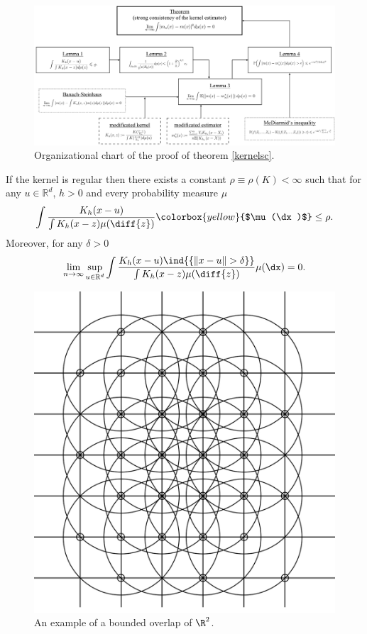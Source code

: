\begin{figure}[h] 
    \includegraphics[scale=0.155]{organigramkernel.jpeg}
    \centering
    \caption{Organizational chart of the proof of theorem \ref{kernelsc}.} \label{chartkernelproof}
\end{figure}

\begin{lemma} \label{coveringlemma}
If the kernel is regular then there exists a constant $\rho \equiv \rho(K)<\infty$ such that for any $u \in \mathbb{R}^d$, $h>0$ and every probability measure $\mu$ \[\int \frac{K_h(x-u)}{\int K_h(x-z) \mu(\diff{z})} \colorbox{yellow}{$\mu(\dx)$} \leq \rho.\]
Moreover, for any $\delta > 0$ \[\lim_{n\to\infty} \sup\limits_{u \in \mathbb{R}^d} \int \frac{K_h(x-u) \ind{\{ \| x-u \| > \delta \} }}{\int K_h(x-z) \mu(\diff{z})} \mu(\dx) = 0.\]
\end{lemma}

\begin{figure}[h] 
    \includegraphics[scale=0.18]{coverofR2.jpeg}
    \centering
    \caption{An example of a bounded overlap of $\R^2$.} \label{figboundedoverlap}
\end{figure}

